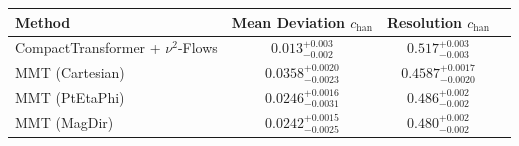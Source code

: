     \begin{tabular}{lccc}
        \toprule
        Method & Mean Deviation $c_{\text{han}}$ & Resolution $c_{\text{han}}$ \\
        \midrule
        CompactTransformer + $\nu^2$-Flows & $0.013^{+0.003}_{-0.002}$ & $0.517^{+0.003}_{-0.003}$ \\
        MMT (Cartesian) & $0.0358^{+0.0020}_{-0.0023}$ & $0.4587^{+0.0017}_{-0.0020}$ \\
        MMT (PtEtaPhi) & $0.0246^{+0.0016}_{-0.0031}$ & $0.486^{+0.002}_{-0.002}$ \\
        MMT (MagDir) & $0.0242^{+0.0015}_{-0.0025}$ & $0.480^{+0.002}_{-0.002}$ \\
        \bottomrule
    \end{tabular}